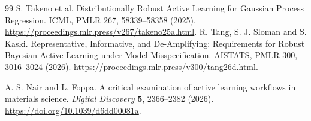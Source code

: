 \begin{thebibliography}{99}
 S. Takeno et al. Distributionally Robust Active Learning for Gaussian Process Regression. ICML, PMLR 267, 58339--58358 (2025). \url{https://proceedings.mlr.press/v267/takeno25a.html}.
 R. Tang, S. J. Sloman and S. Kaski. Representative, Informative, and De-Amplifying: Requirements for Robust Bayesian Active Learning under Model Misspecification. AISTATS, PMLR 300, 3016--3024 (2026). \url{https://proceedings.mlr.press/v300/tang26d.html}.

 A. S. Nair and L. Foppa. A critical examination of active learning workflows in materials science. \emph{Digital Discovery} \textbf{5}, 2366--2382 (2026). \url{https://doi.org/10.1039/d6dd00081a}.
\end{thebibliography}
